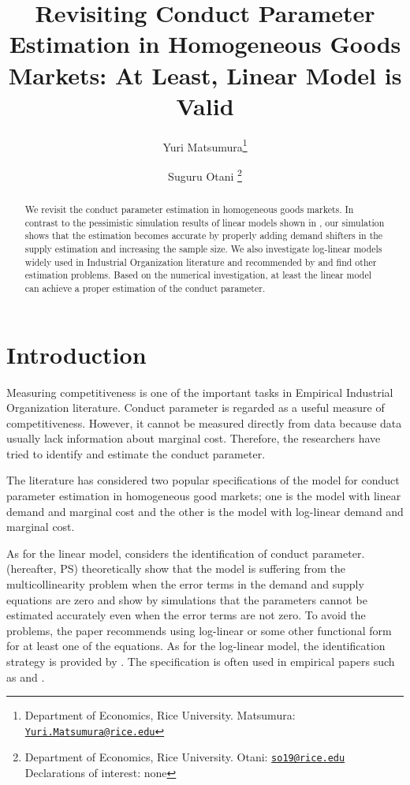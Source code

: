 \documentclass[11pt, a4paper]{article}
\title{Revisiting Conduct Parameter Estimation in Homogeneous Goods Markets: At Least, Linear Model is Valid}
\author{Yuri Matsumura\footnote{Department of Economics, Rice University. Matsumura: \texttt{\href{mailto:Yuri.Matsumura@rice.edu}{Yuri.Matsumura@rice.edu}}} \and Suguru Otani \footnote{Department of Economics, Rice University. Otani: \texttt{\href{mailto:so19@rice.edu}{so19@rice.edu}}\\
Declarations of interest: none}}
\begin{document}
\maketitle

\begin{abstract}
    We revisit the conduct parameter estimation in homogeneous goods markets. In contrast to the pessimistic simulation results of linear models shown in \cite{perloff2012collinearity}, our simulation shows that the estimation becomes accurate by properly adding demand shifters in the supply estimation and increasing the sample size. We also investigate log-linear models widely used in Industrial Organization literature and recommended by \cite{perloff2012collinearity} and find other estimation problems. Based on the numerical investigation, at least the linear model can achieve a proper estimation of the conduct parameter.
\end{abstract}

\section{Introduction}

Measuring competitiveness is one of the important tasks in Empirical Industrial Organization literature.
Conduct parameter is regarded as a useful measure of competitiveness. 
However, it cannot be measured directly from data because data usually lack information about marginal cost.
Therefore, the researchers have tried to identify and estimate the conduct parameter.

The literature has considered two popular specifications of the model for conduct parameter estimation in homogeneous good markets; one is the model with linear demand and marginal cost and the other is the model with log-linear demand and marginal cost.

As for the linear model, \citet{bresnahan1982oligopoly} considers the identification of conduct parameter. 
\citet{perloff2012collinearity} (hereafter, PS) theoretically show that the model is suffering from the multicollinearity problem when the error terms in the demand and supply equations are zero and show by simulations that the parameters cannot be estimated accurately even when the error terms are not zero.
To avoid the problems, the paper recommends using log-linear or some other functional form for at least one of the equations.
As for the log-linear model, the identification strategy is provided by \citet{lau1982identifying}. 
The specification is often used in empirical papers such as \cite{okazaki2022excess} and \cite{merel2009measuring}.
\end{document}

